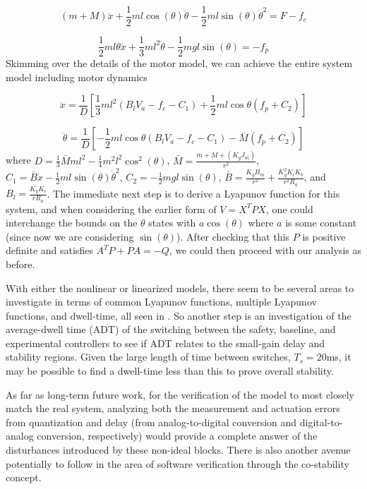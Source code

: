 \documentclass[conference]{IEEEtran}
\begin{document}
\begin{equation}
\left(m+M\right)\ddot{x}+\frac{1}{2}ml\cos\left(\theta\right)\ddot{\theta}-\frac{1}{2}ml\sin\left(\theta\right)\dot{\theta}^2=F-f_c
\end{equation}

\begin{equation}
\frac{1}{2}ml\mathsf{\theta}\ddot{x}+\frac{1}{3}ml^2\ddot{\theta}-\frac{1}{2}mgl\sin\left(\theta\right)=-f_p
\end{equation} Skimming over the details of the motor model, we can achieve the entire system model including motor dynamics

\begin{equation}
\ddot{x}=\frac{1}{D}\left[\frac{1}{3}ml^2\left(B_lV_a-f_c-C_1\right)+\frac{1}{2}ml\cos\theta\left(f_p+C_2\right)\right]
\end{equation}

\begin{equation}
\ddot{\theta}=\frac{1}{D}\left[-\frac{1}{2}ml\cos\theta\left(B_lV_a-f_c-C_1\right)-\bar{M}\left(f_p+C_2\right)\right]
\end{equation} where $D=\frac{1}{3}\bar{M}ml^2-\frac{1}{4}m^2l^2\cos^2\left(\theta\right)$, $\bar{M}=\frac{m+M+(K_gJ_m)}{r^2}$, $C_1=\bar{B}\dot{x}-\frac{1}{2}ml\sin\left(\theta\right)\dot{\theta}^2$, $C_2=-\frac{1}{2}mgl\sin\left(\theta\right)$, $\bar{B}=\frac{K_gB_m}{r^2}+\frac{K_g^2K_iK_b}{r^2R_a}$, and $B_l=\frac{K_gK_i}{rR_a}$.  The immediate next step is to derive a Lyapunov function for this system, and when considering the earlier form of $V=X^TPX$, one could interchange the bounds on the $\theta$ states with $a\cos\left(\theta\right)$ where $a$ is some constant (since now we are considering $\sin\left(\theta\right)$).  After checking that this $P$ is positive definite and satisfies $A^TP+PA=-Q$, we could then proceed with our analysis as before.

With either the nonlinear or linearized models, there seem to be several areas to investigate in terms of common Lyapunov functions, multiple Lyapunov functions, and dwell-time, all seen in \cite{LiberzonSSC2003}.  So another step is an investigation of the average-dwell time (ADT) of the switching between the safety, baseline, and experimental controllers to see if ADT relates to the small-gain delay and stability regions.  Given the large length of time between switches, $T_s=20$ms, it may be possible to find a dwell-time less than this to prove overall stability.

As far as long-term future work, for the verification of the model to most closely match the real system, analyzing both the measurement and actuation errors from quantization and delay (from analog-to-digital conversion and digital-to-analog conversion, respectively) would provide a complete answer of the disturbances introduced by these non-ideal blocks.  There is also another avenue potentially to follow in the area of software verification through the co-stability concept.
\end{document}
